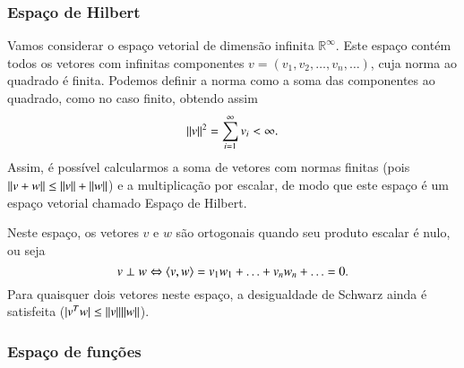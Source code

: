 \subsubsection{Espaço de Hilbert}

Vamos considerar o espaço vetorial de dimensão infinita ${\mathbb{R}}^{\infty}$. Este espaço contém todos os vetores com infinitas componentes $v = (v_1,v_2,\ldots,v_n,\ldots)$, cuja norma ao quadrado é finita. Podemos definir a norma como a soma das componentes ao quadrado, como no caso finito, obtendo assim
\begin{equation*}
   \| v \|^2 = \sum_{i=1}^{\infty} v_i < \infty.
\end{equation*}
Assim, é possível calcularmos a soma de vetores com normas finitas (pois $\| v+w \| \leq \| v \|+\| w \|$) e a multiplicação por escalar, de modo que este espaço é um espaço vetorial chamado Espaço de Hilbert.

Neste espaço, os vetores $v$ e $w$ são ortogonais quando seu produto escalar é nulo, ou seja
\begin{equation*}
  v\perp w \Leftrightarrow \langle v, w \rangle = v_1w_1+\ldots+v_nw_n+\ldots=0.
\end{equation*}
Para quaisquer dois vetores neste espaço, a desigualdade de Schwarz ainda é satisfeita ($|v^Tw| \leq \| v \|\| w \|$).

\subsubsection{Espaço de funções}

